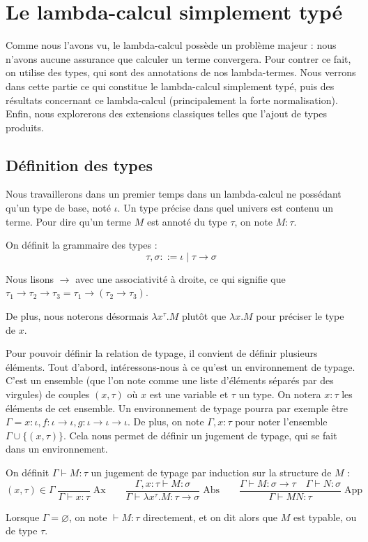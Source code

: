 \section[Lambda-calcul typé]{Le lambda-calcul simplement typé}

Comme nous l'avons vu, le lambda-calcul possède un problème majeur : nous n'avons aucune assurance que calculer un terme convergera. Pour contrer ce fait, on utilise des types, qui sont des annotations de nos lambda-termes. Nous verrons dans cette partie ce qui constitue le lambda-calcul simplement typé, puis des résultats concernant ce lambda-calcul (principalement la forte normalisation). Enfin, nous explorerons des extensions classiques telles que l'ajout de types produits.

\subsection{Définition des types}

Nous travaillerons dans un premier temps dans un lambda-calcul ne possédant qu'un type de base, noté $\iota$. Un type précise dans quel univers est contenu un terme. Pour dire qu'un terme $M$ est annoté du type $\tau$, on note $M :\tau$.

\begin{defi}[Type]
    On définit la grammaire des types :
    $$\tau,\sigma ::= \iota\mid\tau\to\sigma$$
    
    Nous lisons $\to$ avec une associativité à droite, ce qui signifie que $\tau_1\to\tau_2\to\tau_3 = \tau_1\to(\tau_2\to\tau_3)$.
\end{defi}

De plus, nous noterons désormais $\lambda x^\tau.M$ plutôt que $\lambda x.M$ pour préciser le type de $x$.

Pour pouvoir définir la relation de typage, il convient de définir plusieurs éléments. Tout d'abord, intéressons-nous à ce qu'est un environnement de typage. C'est un ensemble (que l'on note comme une liste d'éléments séparés par des virgules) de couples $(x,\tau)$ où $x$ est une variable et $\tau$ un type. On notera $x : \tau$ les éléments de cet ensemble. Un environnement de typage pourra par exemple être $\Gamma = x : \iota, f : \iota\to\iota, g : \iota\to\iota\to\iota$. De plus, on note $\Gamma,x : \tau$ pour noter l'ensemble $\Gamma\cup \{(x,\tau)\}$. Cela nous permet de définir un jugement de typage, qui se fait dans un environnement.

\begin{defi}
    On définit $\Gamma\vdash M : \tau$ un jugement de typage par induction sur la structure de $M$ :
    $$(x,\tau)\in\Gamma\;\dfrac{}{\Gamma\vdash x : \tau}\;\mathrm{Ax}\qquad \dfrac{\Gamma,x : \tau\vdash M : \sigma}{\Gamma\vdash\lambda x^\tau.M : \tau\to\sigma}\;\mathrm{Abs}\qquad\dfrac{\Gamma\vdash M : \sigma \to \tau \quad \Gamma\vdash N : \sigma}{\Gamma\vdash M N : \tau}\;\mathrm{App}$$
    
    Lorsque $\Gamma=\varnothing$, on note $\vdash M : \tau$ directement, et on dit alors que $M$ est typable, ou de type $\tau$.
\end{defi}

